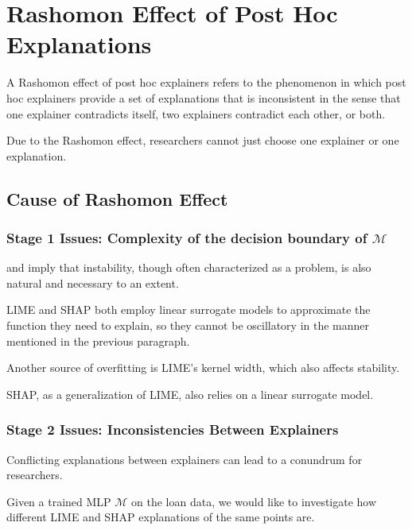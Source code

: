 \documentclass[mnsc,blindrev]{informs3}
\begin{document}
            
\section{Rashomon Effect of Post Hoc Explanations}
        A Rashomon effect of post hoc explainers refers to the phenomenon in which post hoc explainers provide a set of explanations that is inconsistent in the sense that one explainer contradicts itself, two explainers contradict each other, or both. 
        
        Due to the Rashomon effect, researchers cannot just choose one explainer or one explanation.

\subsection{Cause of Rashomon Effect} 
\subsubsection{Stage 1 Issues: Complexity of the decision boundary of $\mathcal{M}$}
    \label{sec:rashomon_overfitting}
         \citep{alvarez18robustness} and  \citep{laugel18defining} imply that instability, though often characterized as a problem, is also natural and necessary to an extent. 

        LIME and SHAP both employ linear surrogate models to approximate the function they need to explain, so they cannot be oscillatory in the manner mentioned in the previous paragraph. 
        
        Another source of overfitting is LIME's kernel width, which also affects stability. 

        SHAP, as a generalization of LIME, also relies on a linear surrogate model. 

        \subsubsection{Stage 2 Issues: Inconsistencies Between Explainers}
        \label{sec:conflict_between}
            Conflicting explanations between explainers can lead to a conundrum for researchers.  
  
    
            Given a trained MLP $\mathcal{M}$ on the loan data, we would like to investigate how different LIME and SHAP explanations of the same points are.
\end{document}
